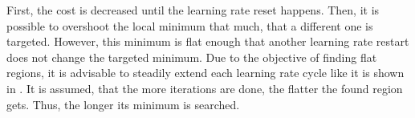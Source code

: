 First, the cost is decreased until the learning rate reset happens.
Then, it is possible to overshoot the local minimum that much, that a different one is targeted.
However, this minimum is flat enough that another learning rate restart does not change the targeted minimum.
Due to the objective of finding flat regions, it is advisable to steadily extend each learning rate cycle like it is shown in .
It is assumed, that the more iterations are done, the flatter the found region gets.
Thus, the longer its minimum is searched.